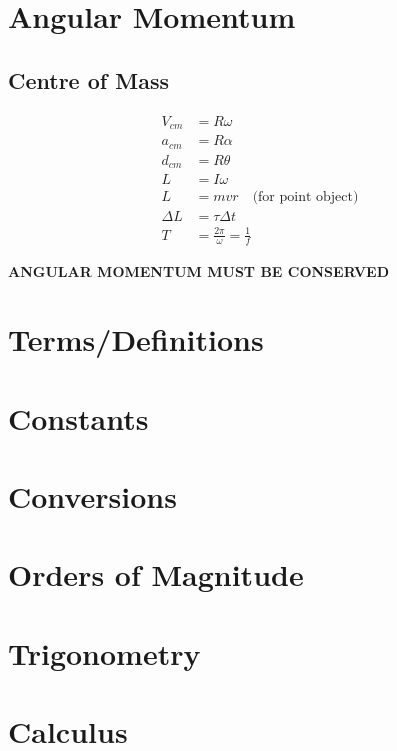 \documentclass[letterpaper,10pt]{article}
\begin{document}
\begin{multicols}{2}
\section{Angular Momentum}
\subsection{Centre of Mass}
\begin{align*}
    V_{cm} &= R \omega \\
    a_{cm} &= R \alpha \\
    d_{cm} &= R \theta \\
    L &= I \omega \\
    L &= mvr \quad \textrm{(for point object)} \\
    \Delta L &= \tau \Delta t \\
    T &= \frac{2 \pi}{\omega} = \frac{1}{f}
\end{align*}

\medskip
\begin{center}
    \textbf{ANGULAR MOMENTUM MUST BE CONSERVED}
\end{center}

\appendix
\section{Terms/Definitions}

\section{Constants}

\section{Conversions}

\section{Orders of Magnitude}

\section{Trigonometry}

\section{Calculus}

\end{multicols}
\end{document}
